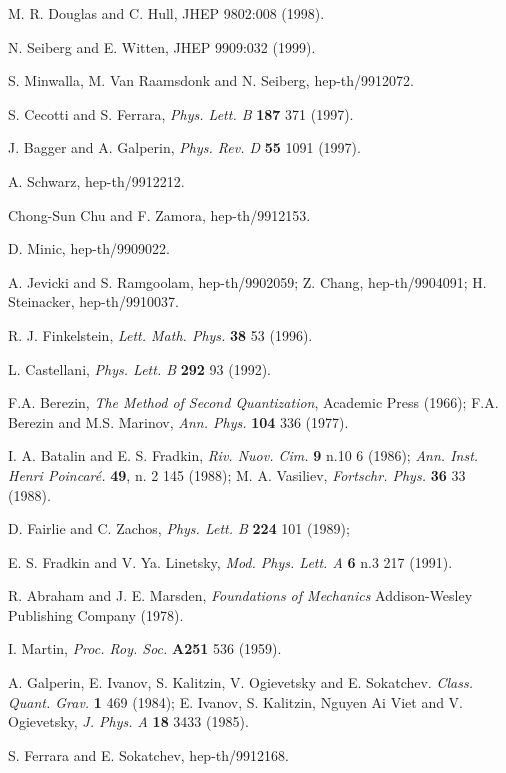 \documentclass[a4paper,12pt]{article}
\begin{document}
\begin{thebibliography}{100}
 M. R. Douglas and C. Hull, JHEP 9802:008 (1998). 

 N. Seiberg and E. Witten,  JHEP 9909:032 (1999).

 S. Minwalla, M. Van Raamsdonk and N. Seiberg,
hep-th/9912072.

 S. Cecotti and S. Ferrara, {\it Phys. Lett. B} {\bf 187} 371
(1997).

 J. Bagger and A. Galperin, {\it Phys. Rev. D} {\bf 55} 1091
(1997).

 A. Schwarz, hep-th/9912212.

 Chong-Sun Chu and F. Zamora, hep-th/9912153.

 D. Minic, hep-th/9909022.

 A. Jevicki and S. Ramgoolam, hep-th/9902059; Z. Chang,
hep-th/9904091;
H. Steinacker, hep-th/9910037.

 R. J. Finkelstein, {\it Lett. Math. Phys.} {\bf 38} 53
(1996).

 L. Castellani, {\it Phys. Lett. B} {\bf 292} 93 (1992).



 F.A. Berezin, {\it The Method of Second Quantization},
Academic Press (1966); F.A. Berezin and M.S. Marinov, {\it Ann. Phys.}
{\bf 104} 336 (1977).

 I. A. Batalin and E. S. Fradkin, {\it Riv. Nuov. Cim.} 
{\bf 9} n.10 6 (1986); {\it Ann. Inst.
Henri Poincar\'e.} {\bf 49}, n. 2 145 (1988); M. A. Vasiliev, {\it
Fortschr. Phys. } {\bf 36} 33  (1988).

 D. Fairlie and C. Zachos, {\it Phys. Lett. B}  {\bf 224} 101 (1989);


 E. S. Fradkin and V. Ya. Linetsky, {\it
Mod. Phys. Lett. A}  {\bf 6} n.3 217 (1991).

 R. Abraham and J. E. Marsden, {\it Foundations of
Mechanics} Addison-Wesley Publishing Company (1978).

 I.  Martin, {\it  Proc. Roy. Soc.} {\bf A251} 536  (1959).

 A. Galperin, E. Ivanov, S. Kalitzin, V. Ogievetsky and
 E. Sokatchev. {\it Class. Quant. Grav.} {\bf 1} 469  (1984); E. Ivanov,
 S. Kalitzin, Nguyen Ai Viet and V. Ogievetsky, {\it J. Phys. A} 
{\bf 18} 3433  (1985).

 S. Ferrara and E. Sokatchev, hep-th/9912168.


\end{thebibliography}
\end{document}
